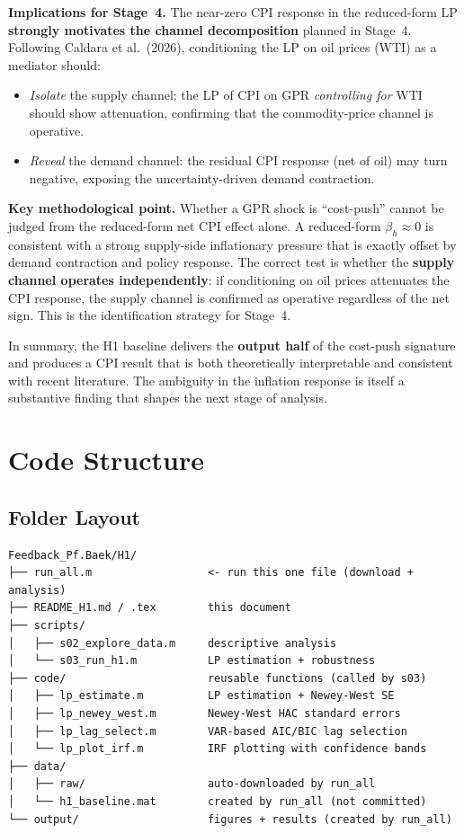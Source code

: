 \documentclass[11pt,a4paper]{article}
\begin{document}
\medskip
\noindent\textbf{Implications for Stage~4.} The near-zero CPI response in the reduced-form LP \textbf{strongly motivates the channel decomposition} planned in Stage~4. Following Caldara et al.\ (2026), conditioning the LP on oil prices (WTI) as a mediator should:
\begin{itemize}[itemsep=2pt]
    \item \textit{Isolate} the supply channel: the LP of CPI on GPR \textit{controlling for} WTI should show attenuation, confirming that the commodity-price channel is operative.
    \item \textit{Reveal} the demand channel: the residual CPI response (net of oil) may turn negative, exposing the uncertainty-driven demand contraction.
\end{itemize}

\medskip
\noindent\textbf{Key methodological point.} Whether a GPR shock is ``cost-push'' cannot be judged from the reduced-form net CPI effect alone. A reduced-form $\beta_h \approx 0$ is consistent with a strong supply-side inflationary pressure that is exactly offset by demand contraction and policy response. The correct test is whether the \textbf{supply channel operates independently}: if conditioning on oil prices attenuates the CPI response, the supply channel is confirmed as operative regardless of the net sign. This is the identification strategy for Stage~4.

\medskip
\noindent In summary, the H1 baseline delivers the \textbf{output half} of the cost-push signature and produces a CPI result that is both theoretically interpretable and consistent with recent literature. The ambiguity in the inflation response is itself a substantive finding that shapes the next stage of analysis.

\section{Code Structure}

\subsection{Folder Layout}

\begin{verbatim}
Feedback_Pf.Baek/H1/
├── run_all.m                  <- run this one file (download + analysis)
├── README_H1.md / .tex        this document
├── scripts/
│   ├── s02_explore_data.m     descriptive analysis
│   └── s03_run_h1.m           LP estimation + robustness
├── code/                      reusable functions (called by s03)
│   ├── lp_estimate.m          LP estimation + Newey-West SE
│   ├── lp_newey_west.m        Newey-West HAC standard errors
│   ├── lp_lag_select.m        VAR-based AIC/BIC lag selection
│   └── lp_plot_irf.m          IRF plotting with confidence bands
├── data/
│   ├── raw/                   auto-downloaded by run_all
│   └── h1_baseline.mat        created by run_all (not committed)
└── output/                    figures + results (created by run_all)
\end{verbatim}
\end{document}
